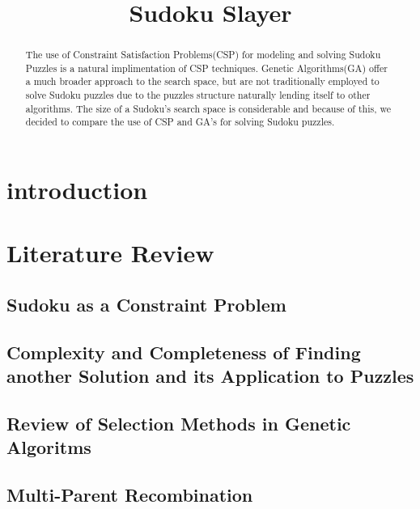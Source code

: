 \documentclass[10pt, conference]{IEEEtran}
\begin{document}
\title{Sudoku Slayer}

\author{
\and
{}
}

\maketitle

\begin{abstract}

The use of Constraint Satisfaction Problems(CSP) for modeling and solving Sudoku Puzzles is a natural implimentation of CSP techniques.
Genetic Algorithms(GA) offer a much broader approach to the search space, but are not traditionally employed to solve Sudoku puzzles due to the puzzles structure naturally lending itself to other algorithms.
The size of a Sudoku's search space is considerable and because of this, we decided to compare the use of CSP and GA's for solving Sudoku puzzles.

\end{abstract}

\section{introduction}

\section{Literature Review}

\subsection{Sudoku as a Constraint Problem}

\subsection{Complexity and Completeness of Finding another Solution and its Application to Puzzles}

\subsection{Review of Selection Methods in Genetic Algoritms}

\subsection{Multi-Parent Recombination}
\end{document}
